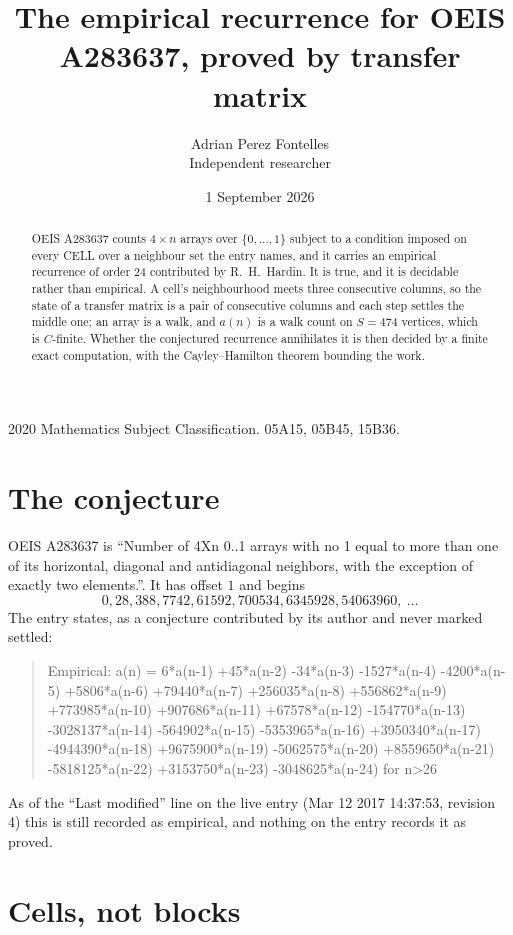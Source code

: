 \documentclass[11pt,a4paper]{article}
\title{The empirical recurrence for OEIS A283637, proved by transfer matrix}
\author{Adrian Perez Fontelles\\ \small Independent researcher}
\date{1 September 2026}
\theoremstyle{plain}
\theoremstyle{definition}
\begin{document}
\maketitle

\begin{abstract}
OEIS A283637 counts $4\times n$ arrays over $\{0,\dots,1\}$ subject to a condition imposed on
every CELL over a neighbour set the entry names, and it carries an empirical recurrence of
order $24$ contributed by R.~H.~Hardin. It is true, and it is decidable rather than
empirical. A cell's neighbourhood meets three consecutive columns, so the state of a transfer
matrix is a pair of consecutive columns and each step settles the middle one; an array is a
walk, and $a(n)$ is a walk count on $S=474$ vertices, which is $C$-finite. Whether the
conjectured recurrence annihilates it is then decided by a finite exact computation, with the
Cayley--Hamilton theorem bounding the work.
\end{abstract}

\noindent\small 2020 Mathematics Subject Classification. 05A15, 05B45, 15B36.\normalsize

\section{The conjecture}

OEIS A283637 is ``Number of 4Xn 0..1 arrays with no 1 equal to more than one of its horizontal, diagonal and antidiagonal neighbors, with the exception of exactly two elements.''. It has offset $1$ and begins
\[
0, 28, 388, 7742, 61592, 700534, 6345928, 54063960,\ \dots
\]
The entry states, as a conjecture contributed by its author and never marked settled:
\begin{quote}
Empirical: a(n) = 6*a(n-1) +45*a(n-2) -34*a(n-3) -1527*a(n-4) -4200*a(n-5) +5806*a(n-6) +79440*a(n-7) +256035*a(n-8) +556862*a(n-9) +773985*a(n-10) +907686*a(n-11) +67578*a(n-12) -154770*a(n-13) -3028137*a(n-14) -564902*a(n-15) -5353965*a(n-16) +3950340*a(n-17) -4944390*a(n-18) +9675900*a(n-19) -5062575*a(n-20) +8559650*a(n-21) -5818125*a(n-22) +3153750*a(n-23) -3048625*a(n-24) for n>26
\end{quote}
As of the ``Last modified'' line on the live entry (Mar 12 2017 14:37:53, revision 4) this is still
recorded as empirical, and nothing on the entry records it as proved.

\section{Cells, not blocks}
\end{document}
